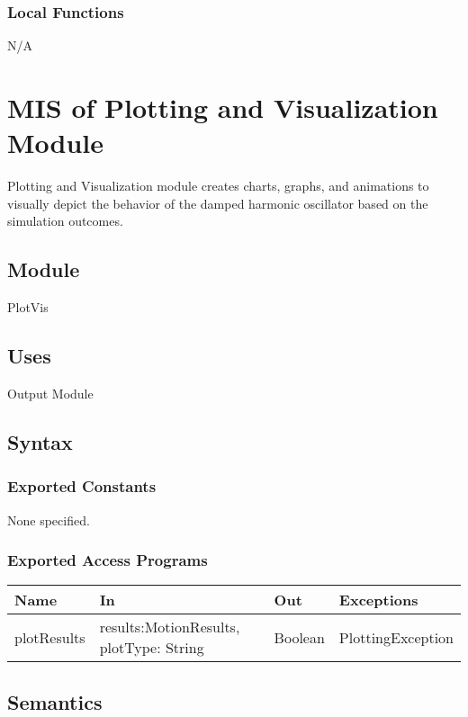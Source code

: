 \documentclass[12pt, titlepage]{article}
\begin{document}
\subsubsection{Local Functions}
N/A



\section{MIS of Plotting and Visualization Module} \label{mPVM}

Plotting and Visualization module creates charts, graphs, and animations to visually depict the behavior of the
damped harmonic oscillator based on the simulation outcomes.

\subsection{Module}
PlotVis

\subsection{Uses}
Output Module

\subsection{Syntax}

\subsubsection{Exported Constants}
None specified.

\subsubsection{Exported Access Programs}

\begin{center}
\begin{tabular}{p{4cm} p{4cm} p{3cm} p{5cm}}
\hline
\textbf{Name} & \textbf{In} & \textbf{Out} & \textbf{Exceptions} \\
\hline
plotResults & results:MotionResults, plotType: String & Boolean & PlottingException \\
\hline
\end{tabular}
\end{center}

\subsection{Semantics}
\end{document}
